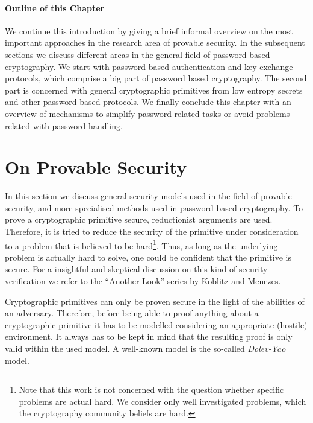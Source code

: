 \paragraph{Outline of this Chapter}
We continue this introduction by giving a brief informal overview on the most important approaches in the research area of provable security.
In the subsequent sections we discuss different areas in the general field of password based cryptography.
We start with password based authentication and key exchange protocols, which comprise a big part of password based cryptography.
The second part is concerned with general cryptographic primitives from low entropy secrets and other password based protocols.
We finally conclude this chapter with an overview of mechanisms to simplify password related tasks or avoid problems related with password handling.


\section{On Provable Security}
In this section we discuss general security models used in the field of provable security, and more specialised methods used in password based cryptography.
To prove a cryptographic primitive secure, reductionist arguments are used.
Therefore, it is tried to reduce the security of the primitive under consideration to a problem that is believed to be hard\footnote{Note that this work is not concerned with the question whether specific problems are actual hard. We consider only well investigated problems, which the cryptography community beliefs are hard.}.
Thus, as long as the underlying problem is actually hard to solve, one could be confident that the primitive is secure.
For a insightful and skeptical discussion on this kind of security verification we refer to the ``Another Look'' \cite{AnotherLook} series by Koblitz and Menezes.

Cryptographic primitives can only be proven secure in the light of the abilities of an adversary.
Therefore, before being able to proof anything about a cryptographic primitive it has to be modelled considering an appropriate (hostile) environment.
It always has to be kept in mind that the resulting proof is only valid within the used model.
A well-known model is the so-called \emph{Dolev-Yao} model.

